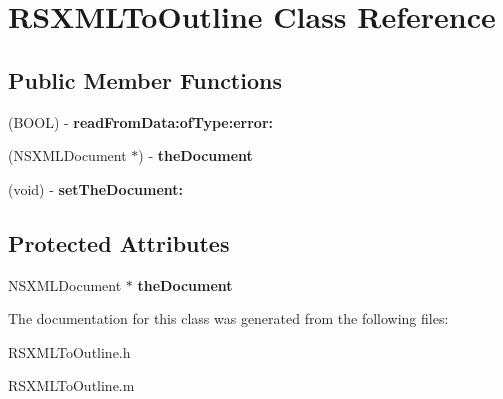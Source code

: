\hypertarget{interface_r_s_x_m_l_to_outline}{
\section{RSXMLToOutline Class Reference}
\label{interface_r_s_x_m_l_to_outline}
}
\subsection*{Public Member Functions}
\begin{DoxyCompactItemize}
\item 
\hypertarget{interface_r_s_x_m_l_to_outline_a4cf6d0eb20eb5a33f3fc233877956eb0}{
(BOOL) -\/ {\bfseries readFromData:ofType:error:}}
\label{interface_r_s_x_m_l_to_outline_a4cf6d0eb20eb5a33f3fc233877956eb0}

\item 
\hypertarget{interface_r_s_x_m_l_to_outline_a1f12cbe0e230cb40862498080008b6ed}{
(NSXMLDocument $\ast$) -\/ {\bfseries theDocument}}
\label{interface_r_s_x_m_l_to_outline_a1f12cbe0e230cb40862498080008b6ed}

\item 
\hypertarget{interface_r_s_x_m_l_to_outline_a8b2bfb44bc31da18cd4f9a2a30e36704}{
(void) -\/ {\bfseries setTheDocument:}}
\label{interface_r_s_x_m_l_to_outline_a8b2bfb44bc31da18cd4f9a2a30e36704}

\end{DoxyCompactItemize}
\subsection*{Protected Attributes}
\begin{DoxyCompactItemize}
\item 
\hypertarget{interface_r_s_x_m_l_to_outline_a54352bd940b39ceabcd2e991d12cfc83}{
NSXMLDocument $\ast$ {\bfseries theDocument}}
\label{interface_r_s_x_m_l_to_outline_a54352bd940b39ceabcd2e991d12cfc83}

\end{DoxyCompactItemize}


The documentation for this class was generated from the following files:\begin{DoxyCompactItemize}
\item 
RSXMLToOutline.h\item 
RSXMLToOutline.m\end{DoxyCompactItemize}
